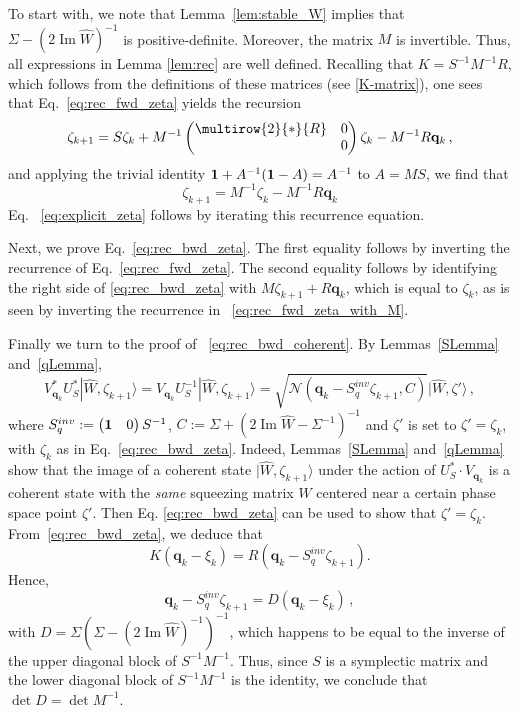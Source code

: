 \documentclass[12pt]{article}
\newcommand{\ket}[1]{|{#1}\rangle}
\renewcommand{\Im}{\operatorname{Im}}
\begin{document}
	To start with, we note that Lemma~\ref{lem:stable_W} implies that $\Sigma-(2\Im \widehat W)^{-1}$ is positive-definite. Moreover, the matrix $M$ is invertible. Thus, all expressions in Lemma \ref{lem:rec} are well defined. Recalling that 
	$K=S^{-1}M^{-1}R$, which follows from the definitions of these matrices (see \eqref{K-matrix}), one sees that Eq.~\eqref{eq:rec_fwd_zeta} yields the recursion
	$$\zeta_{k+1}= S\zeta_k +M^{-1}\begin{pmatrix}
	\multirow{2}{*}{R}&0\\&0
	\end{pmatrix}\zeta_k -M^{-1}R\mathbf{q}_k\,,$$
	and applying the trivial identity ${\bf{1}}+ A^{-1}({\bf{1}}-A)=A^{-1}$ to $A=MS$, we find that
	\begin{equation}\label{eq:rec_fwd_zeta_with_M}
	\zeta_{k+1}=M^{-1}\zeta_k-M^{-1}R\mathbf q_k
	\end{equation}
	Eq. ~\eqref{eq:explicit_zeta} follows by iterating this recurrence equation.
	
	Next, we prove Eq.~\eqref{eq:rec_bwd_zeta}. The first equality follows by inverting the recurrence of Eq.~\eqref{eq:rec_fwd_zeta}. The second equality follows by identifying the right side of \eqref{eq:rec_bwd_zeta} with $M\zeta_{k+1} +R\mathbf{q}_{k}$, which is equal to $\zeta_{k}$, as is seen by inverting the recurrence in ~\eqref{eq:rec_fwd_zeta_with_M}.
	
	Finally we turn to the proof of ~\eqref{eq:rec_bwd_coherent}. By Lemmas~\ref{SLemma} and~\ref{qLemma},
	$$V_{\mathbf q_k}^*U_S^*\ket{\widehat W,\zeta_{k+1}}=V_{\mathbf q_k}U_S^{-1}\ket{\widehat W,\zeta_{k+1}}=\sqrt{\mathcal N(\mathbf{q}_k - S^{inv}_q\zeta_{k+1},C)}\ket{\widehat W,\zeta'}\,,$$
	where $S_q^{inv}:=\begin{pmatrix}{\bf{1}} &0\end{pmatrix}S^{-1}$, $C:=\Sigma+(2\Im \widehat W -\Sigma^{-1})^{-1}$ and 
	$\zeta'$ is set to $\zeta'=\zeta_k$, with $\zeta_k$ as in Eq.~\eqref{eq:rec_bwd_zeta}. 
	Indeed, Lemmas~\ref{SLemma} and~\ref{qLemma} show that the image of a coherent state $\vert \widehat{W}, \zeta_{k+1} \rangle$ under the action of 
	$U_S^* \cdot V_{\mathbf q_k}$ is a coherent state with the \textit{same} squeezing matrix $\widehat{W}$ centered near a certain phase space point $\zeta'$. Then Eq. \eqref{eq:rec_bwd_zeta} can be used to show that $\zeta'=\zeta_k$.\\
From~\eqref{eq:rec_bwd_zeta}, we deduce that
	$$K(\mathbf{q}_{k}-\xi_{k})=R(\mathbf{q}_{k} -S_q^{inv}\zeta_{k+1}).$$
	Hence,
	$$\mathbf{q}_{k} -S_q^{inv}\zeta_{k+1}=D(\mathbf{q}_{k}-\xi_{k})\,,$$
	with $D=\Sigma(\Sigma-(2\Im \widehat W)^{-1})^{-1}$, which happens to be equal to the inverse of the upper diagonal block of $S^{-1}M^{-1}$. Thus, since $S$ is a symplectic matrix and the lower diagonal block of $S^{-1}M^{-1}$ is the identity, we conclude that $\det D=\det M^{-1}$.
	
\end{document}
